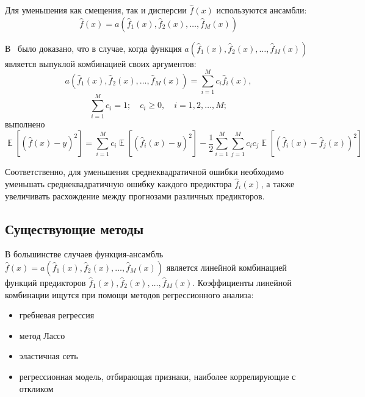 \documentclass[12pt, fleqn]{article}
\newcommand{\expectation}{\mathop{\mathbb{E}}}
\newcommand{\predictionfunction}{\hat{f}}
\newcommand{\ensemblefunction}{a}
\newcommand{\numberpredictionfunctions}{M}
\newcommand{\for}[3]{\sum\limits_{#1 = #2}^{#3}}  %
\newcommand{\forn}[2]{\for{#1}{1}{#2}}  %
\newcommand{\many}[3]{#1 1 #2, #1 2 #2, \dots, #1 #3 #2}  %
\newcommand{\ensemblefunctionfull}{\ensemblefunction(\many{\predictionfunction_}{(x)}{\numberpredictionfunctions})}
\begin{document}
Для уменьшения как смещения, так и дисперсии $\predictionfunction(x)$ используются ансамбли:
\begin{equation*}
\predictionfunction(x) = \ensemblefunctionfull
\end{equation*}

В~\cite{OptimalConvexCorrectingProcedures} было доказано, что в случае, когда функция $\ensemblefunctionfull$ является выпуклой комбинацией своих аргументов:
\begin{equation*}
\ensemblefunctionfull = 
\forn{i}{\numberpredictionfunctions} c_i \predictionfunction_i(x),
\end{equation*}
\begin{equation*}
\forn{i}{\numberpredictionfunctions} c_i = 1; \quad c_i \geq 0, \quad i = \many{}{}{\numberpredictionfunctions};
\end{equation*}
выполнено
\begin{equation}\label{OptimizedDifferenceDecomposition}
\expectation \left[\left( \predictionfunction(x) - y \right)^2 \right] =
\forn{i}{\numberpredictionfunctions} c_i
\expectation \left[ \left(
	\predictionfunction_i(x) - y
\right)^2 \right] 
- \dfrac{1}{2}
\forn{i}{\numberpredictionfunctions} \forn{j}{\numberpredictionfunctions} c_i c_j
\expectation \left[ \left(
	\predictionfunction_i(x) - \predictionfunction_j(x)
\right)^2 \right]
\end{equation}

Соответственно, для уменьшения среднеквадратичной ошибки необходимо уменьшать среднеквадратичную ошибку каждого предиктора $\predictionfunction_i(x)$, а также увеличивать расхождение между прогнозами различных предикторов.

\subsection{Существующие методы}

В большинстве случаев функция-ансамбль $\predictionfunction(x) = \ensemblefunctionfull$ является линейной комбинацией функций предикторов $\many{\predictionfunction_}{(x)}{\numberpredictionfunctions}$. Коэффициенты линейной комбинации ищутся при помощи методов регрессионного анализа:
\begin{itemize}
\item гребневая регрессия~\cite{Ridge}
\item метод Лассо~\cite{Lasso}
\item эластичная сеть~\cite{ElasticNet}
\item регрессионная модель, отбирающая признаки, наиболее коррелирующие с откликом~\cite{ConvexCombinationsBestCorrelatedWithResponse}
\end{itemize}
\end{document}
